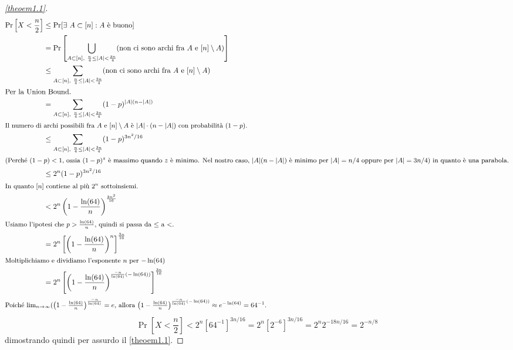 \begin{proof}[\autoref{theoem1.1}]
\begin{align*}
    \Pr\left[X < \frac{n}{2}\right] &\leq \Pr[\exists\ A \subset [n]: A \text{ è buono}] \\
    &= \Pr \left[\bigcup_{A \subset [n],\ \frac{n}{4} \leq |A| < \frac{3n}{4}} (\text{non ci sono archi fra $A$ e $[n] \setminus A$}) \right] \\
    &\leq \sum_{A \subset [n],\ \frac{n}{4} \leq |A| < \frac{3n}{4}} (\text{non ci sono archi fra $A$ e $[n] \setminus A$}) \\
    \intertext{Per la Union Bound.}
    &= \sum_{A \subset [n],\ \frac{n}{4} \leq |A| < \frac{3n}{4}} (1-p)^{|A|(n-|A|)} \\
    \intertext{\small Il numero di archi possibili fra $A$ e $[n] \setminus A$ è $|A| \cdot (n - |A|)$ con probabilità $(1 - p)$.}
    &\leq \sum_{A \subset [n],\ \frac{n}{4} \leq |A| < \frac{3n}{4}} (1-p)^{3n^2/16} \\
    \intertext{\small (Perché $(1 - p) < 1$, ossia $(1 - p)^z$ è massimo quando $z$ è minimo. Nel nostro caso, $|A|(n - |A|)$ è minimo per $|A| = n/4$ oppure per $|A| = 3n/4$) in quanto è una parabola.}
    &\leq 2^n (1-p)^{3n^2/16} \\
    \intertext{\small In quanto $[n]$ contiene al più $2^n$ sottoinsiemi.}
    &< 2^n \left(1 - \frac{\ln(64)}{n} \right)^{\frac{3n^2}{16}} \\
    \intertext{\small Usiamo l'ipotesi che $p > \frac{\ln(64)}{n}$, quindi si passa da $\leq$ a $<$.}
    &= 2^n \left[\left(1 - \frac{\ln(64)}{n} \right)^n\right]^{\frac{3n}{16}} \\
    \intertext{\small Moltiplichiamo e dividiamo l'esponente $n$ per $-\ln(64)$}
    &= 2^n \left[\left(1 - \frac{\ln(64)}{n} \right)^{\frac{-n}{\ln(64)}(-\ln(64))}\right]^{\frac{3n}{16}} \\
    \intertext{\small Poiché $\lim_{n \to \infty} (\left(1 - \frac{\ln(64)}{n} \right)^{\frac{-n}{\ln(64)}} = e$, allora $\left(1 - \frac{\ln(64)}{n} \right)^{\frac{-n}{\ln(64)}(-\ln(64))} \approx e^{-\ln(64)} = 64^{-1}$.}
\end{align*}
\[
\Pr[X < \frac{n}{2}] < 2^n [64^{-1}]^{3n/16} = 2^n [2^{-6}]^{3n/16} = 2^n 2^{-18n/16} = 2^{-n/8} 
\]
dimostrando quindi per assurdo il \autoref{theoem1.1}. 
\end{proof}

